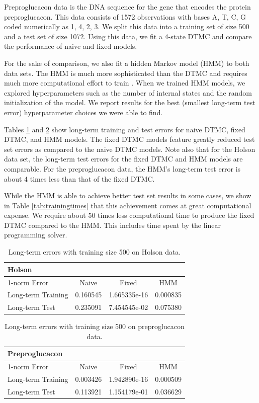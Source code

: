 \documentclass[review,letterpaper,11pt]{elsarticle}
\begin{document}
Preproglucacon data is the DNA sequence for the gene that encodes the protein preproglucacon. This data consists of 1572 observations with bases A, T, C, G coded numerically as 1, 4, 2, 3.  We split this data into a training set of size 500 and a test set of size 1072.  Using this data, we fit a 4-state DTMC and compare the performance of naive and fixed models. 

For the sake of comparison, we also fit a hidden Markov model (HMM) to both data sets.  The HMM is much more sophisticated than the DTMC and requires much more computational effort to train \cite{Fraser2008}.  When we trained HMM models, we explored hyperparameters such as the number of internal states and the random initialization of the model.  We report results for the best (smallest long-term test error) hyperparameter choices we were able to find.

Tables \ref{tab:holson} and \ref{tab:dna} show long-term training and test errors for naive DTMC, fixed DTMC, and HMM models.  The fixed DTMC models feature greatly reduced test set errors as compared to the naive DTMC models.  Note also that for the Holson data set, the long-term test errors for the fixed DTMC and HMM models are comparable.  For the preproglucacon data, the HMM's long-term test error is about 4 times less than that of the fixed DTMC.

While the HMM is able to achieve better test set results in some cases, we show in Table \ref{tab:trainingtimes} that this achievement comes at great computational expense.  We require about 50 times less computational time to produce the fixed DTMC compared to the HMM.  This includes time spent by the linear programming solver.

\begin{table}[tbh]
\centering
\begin{tabular}{lccc}
{\bf Holson} & &\\
\toprule
1-norm Error &     Naive &         Fixed  & HMM\\
\midrule
Long-term Training &  0.160545 & 1.665335e-16 & 0.000835\\
Long-term Test     &  0.235091 &  7.454545e-02 & 0.075380\\
\bottomrule
\end{tabular}
\caption{Long-term errors with training size 500 on Holson data.}
\label{tab:holson}
\end{table}

\begin{table}[tbh]
\centering
\begin{tabular}{lccc}
{\bf Preproglucacon} & &\\
\toprule
1-norm Error &     Naive &         Fixed & HMM\\
\midrule
Long-term Training &  0.003426 &  1.942890e-16 & 0.000509\\
Long-term Test     &  0.113921 &  1.154179e-01 & 0.036629\\
\bottomrule
\end{tabular}
\caption{Long-term errors with training size 500 on preproglucacon data.}
\label{tab:dna}
\end{table}
\end{document}
